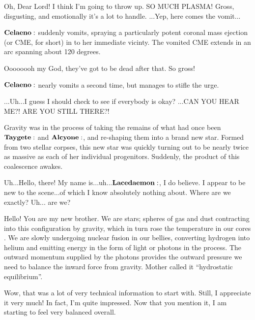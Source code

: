 \documentclass[main.tex]{subfiles}
\begin{document}
\Celaeno Oh, Dear Lord!  I think I'm going to throw up.  SO MUCH PLASMA!  Gross, disgusting, and emotionally it's a lot to handle. ...Yep, here comes the vomit...

$\Celaeno$ suddenly vomits, spraying a particularly potent coronal mass ejection (or CME, for short) in to her immediate vicinty.  The vomited CME extends in an arc spanning about 120 degrees.

\Celaeno Oooooooh my God, they've got to be dead after that.  So gross!  

$\Celaeno$ nearly vomits a second time, but manages to stifle the urge.

\Celaeno ...Uh...I guess I should check to see if everybody is okay? ...CAN YOU HEAR ME?!  ARE YOU STILL THERE?! 

Gravity was in the process of taking the remains of what had once been $\Taygete$ and $\Alcyone$, and re-shaping them into a brand new star.  Formed from two stellar corpses, this new star was quickly turning out to be nearly twice as massive as each of her individual progenitors.  Suddenly, the product of this coalescence awakes.


\Lacedaemon Uh...Hello, there!  My name is...uh...$\Lacedaemon$, I do believe.  I appear to be new to the scene...of which I know absolutely nothing about.  Where are we exactly?  Uh... are we?

\Celaeno Hello!  You are my new brother.  We are stars; spheres of gas and dust contracting into this configuration by gravity, which in turn rose the temperature in our cores .  We are slowly undergoing nuclear fusion in our bellies, converting hydrogen into helium and emitting energy in the form of light or photons in the process.  The outward momentum supplied by the photons provides the outward pressure we need to balance the inward force from gravity.  Mother called it ``hydrostatic equilibrium''.

\Lacedaemon Wow, that was a lot of very technical information to start with.  Still, I appreciate it very much!  In fact, I'm quite impressed.  Now that you mention it, I am starting to feel very balanced overall.  
\end{document}
